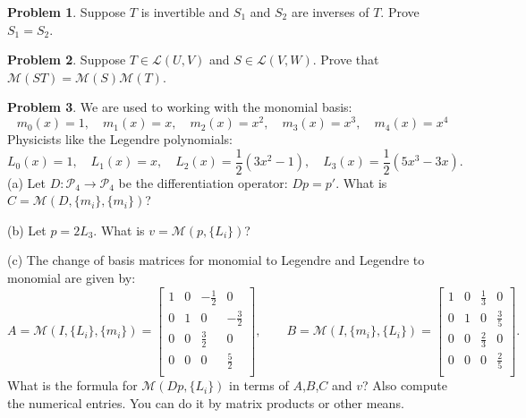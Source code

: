 \documentclass[12pt]{article}
\theoremstyle{definition}
\newtheorem{problem}{Problem}
\begin{document}
\begin{problem}
    Suppose $T$ is invertible and $S_1$ and $S_2$ are inverses of $T$. Prove $S_1 = S_2$.
\end{problem}

\begin{problem}
Suppose $T\in\mathcal{L}(U,V)$ and $S\in \mathcal{L}(V,W)$.
Prove that $\mathcal{M}(ST) = \mathcal{M}(S)\mathcal{M}(T)$.
\end{problem}

\begin{problem}
    We are used to working with the monomial basis:
    \[
    m_0(x) = 1, \quad
    m_1(x) = x, \quad
    m_2(x) = x^2, \quad
    m_3(x) = x^3, \quad
    m_4(x) = x^4
    \]
    Physicists like the Legendre polynomials:
    \[
    L_0(x) = 1 ,\quad
    L_1(x) = x, \quad
    L_2(x) = \frac{1}{2}(3x^2 - 1), \quad
    L_3(x) = \frac{1}{2}(5x^3 - 3x).
    \]
    (a) Let $D:\mathcal{P}_4\to\mathcal{P}_4$ be the differentiation operator: $Dp = p'$.
    What is $C = \mathcal{M}(D,\{m_i\},\{m_i\})$?
    
    \vspace{-.5em}
    (b) Let $p = 2L_3$. 
    What is $v = \mathcal{M}(p,\{L_i\})$?


    (c)     
    The change of basis matrices for monomial to Legendre and Legendre to monomial are given by:
    \[
    A = \mathcal{M}(I,\{L_i\},\{m_i\}) = 
    \begin{bmatrix}
        1 & 0 & -\frac{1}{2} & 0 \\
        0 & 1 & 0 & -\frac{3}{2} \\
        0 & 0 & \frac{3}{2} & 0 \\
        0 & 0 & 0 & \frac{5}{2} \\
    \end{bmatrix}
    ,\qquad
    B = \mathcal{M}(I,\{m_i\},\{L_i\}) = 
    \begin{bmatrix}
        1 & 0 & \frac{1}{3} & 0 \\
        0 & 1 & 0 & \frac{3}{5} \\
        0 & 0 & \frac{2}{3} & 0 \\
        0 & 0 & 0 & \frac{2}{5} \\
    \end{bmatrix}.
    \]
    What is the formula for $\mathcal{M}(Dp,\{L_i\})$ in terms of $A$,$B$,$C$ and $v$? Also compute the numerical entries. You can do it by matrix products or other means.

\end{problem}
\end{document}
